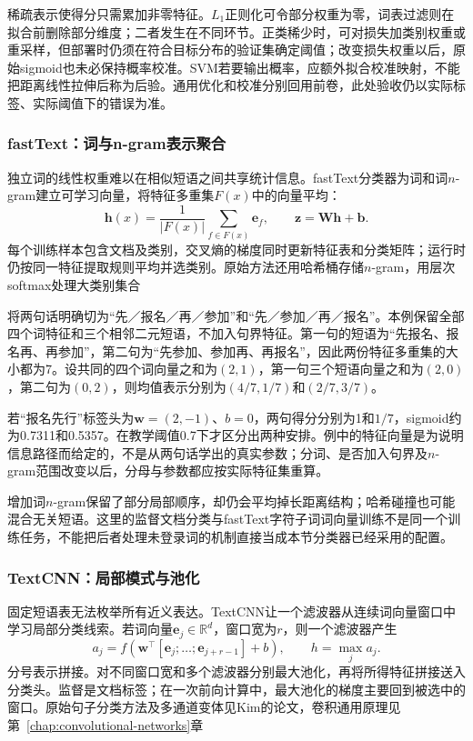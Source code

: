 稀疏表示使得分只需累加非零特征。$L_1$正则化可令部分权重为零，词表过滤则在拟合前删除部分维度；二者发生在不同环节。正类稀少时，可对损失加类别权重或重采样，但部署时仍须在符合目标分布的验证集确定阈值；改变损失权重以后，原始sigmoid也未必保持概率校准。SVM若要输出概率，应额外拟合校准映射，不能把距离线性拉伸后称为后验。通用优化和校准分别回用前卷，此处验收仍以实际标签、实际阈值下的错误为准。

\subsubsection{fastText：词与n-gram表示聚合}
\label{sec:nlp-classification-fasttext}

独立词的线性权重难以在相似短语之间共享统计信息。fastText分类器为词和词$n$-gram建立可学习向量，将特征多重集$F(x)$中的向量平均：
\[
  \bm h(x)=\frac{1}{|F(x)|}\sum_{f\in F(x)}\bm e_f,\qquad
  \bm z=\bm W\bm h+\bm b.
\]
每个训练样本包含文档及类别，交叉熵的梯度同时更新特征表和分类矩阵；运行时仍按同一特征提取规则平均并选类别。原始方法还用哈希桶存储$n$-gram，用层次softmax处理大类别集合

将两句话明确切为“先／报名／再／参加”和“先／参加／再／报名”。本例保留全部四个词特征和三个相邻二元短语，不加入句界特征。第一句的短语为“先报名、报名再、再参加”，第二句为“先参加、参加再、再报名”，因此两份特征多重集的大小都为7。设共同的四个词向量之和为$(2,1)$，第一句三个短语向量之和为$(2,0)$，第二句为$(0,2)$，则均值表示分别为$(4/7,1/7)$和$(2/7,3/7)$。

若“报名先行”标签头为$\bm w=(2,-1)$、$b=0$，两句得分分别为1和$1/7$，sigmoid约为0.7311和0.5357。在教学阈值0.7下才区分出两种安排。例中的特征向量是为说明信息路径而给定的，不是从两句话学出的真实参数；分词、是否加入句界及$n$-gram范围改变以后，分母与参数都应按实际特征集重算。

增加词$n$-gram保留了部分局部顺序，却仍会平均掉长距离结构；哈希碰撞也可能混合无关短语。这里的监督文档分类与fastText字符子词词向量训练不是同一个训练任务，不能把后者处理未登录词的机制直接当成本节分类器已经采用的配置。

\subsubsection{TextCNN：局部模式与池化}
\label{sec:nlp-classification-textcnn}

固定短语表无法枚举所有近义表达。TextCNN让一个滤波器从连续词向量窗口中学习局部分类线索。若词向量$\bm e_j\in\mathbb R^d$，窗口宽为$r$，则一个滤波器产生
\[
  a_j=f\!\left(\bm w^\top
  [\bm e_j;\ldots;\bm e_{j+r-1}]+b\right),\qquad
  h=\max_j a_j.
\]
分号表示拼接。对不同窗口宽和多个滤波器分别最大池化，再将所得特征拼接送入分类头。监督是文档标签；在一次前向计算中，最大池化的梯度主要回到被选中的窗口。原始句子分类方法及多通道变体见Kim的论文，卷积通用原理见第~\ref{chap:convolutional-networks}章

